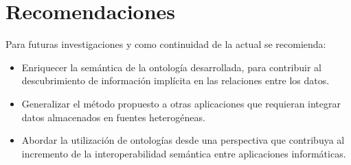 \chapter*{\large Recomendaciones}

Para futuras investigaciones y como continuidad de la actual se recomienda:

\begin{itemize}
\item Enriquecer la semántica de la ontología desarrollada, para contribuir al descubrimiento de información implícita en las relaciones entre los datos.
\item Generalizar el método propuesto a otras aplicaciones que requieran integrar datos almacenados en fuentes heterogéneas.
\item Abordar la utilización de ontologías desde una perspectiva que contribuya al incremento de la interoperabilidad semántica entre aplicaciones informáticas.
\end{itemize}
